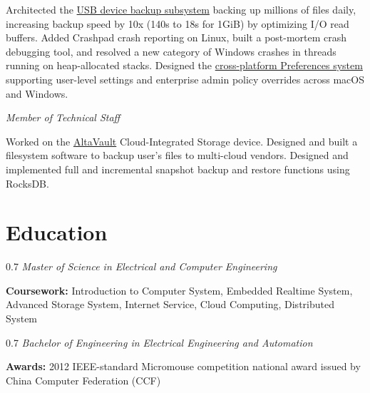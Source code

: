 \documentclass{yijiem}
\begin{document}
\begin{description}
{        {Architected the \href{https://blog.google/products-and-platforms/products/workspace/drive-for-desktop/}{USB device backup subsystem} backing up millions of files daily, increasing backup speed by 10x (140s to 18s for 1GiB) by optimizing I/O read buffers.}
        {Added Crashpad crash reporting on Linux, built a post-mortem crash debugging tool, and resolved a new category of Windows crashes in threads running on heap-allocated stacks.}
        {Designed the \href{https://knowledge.workspace.google.com/admin/drive/advanced-drive-for-desktop-configuration}{cross-platform Preferences system} supporting user-level settings and enterprise admin policy overrides across macOS and Windows.}}
    \end{description}
    \textit{\small Member of Technical Staff}\par\vspace{1pt}
    Worked on the \href{https://www.netapp.com/media/19930-ds-3651.pdf}{AltaVault} Cloud-Integrated Storage device. Designed and built a filesystem software to backup user's files to multi-cloud vendors. Designed and implemented full and incremental snapshot backup and restore functions using RocksDB.

\section{Education}
    \begin{spacing}{0.7}
    \textit{\small Master of Science in Electrical and Computer Engineering}\newline
    \end{spacing}
    \textbf{Coursework:} Introduction to Computer System, Embedded Realtime System, Advanced Storage System, Internet Service, Cloud Computing, Distributed System
    \begin{spacing}{0.7}
    \textit{\small Bachelor of Engineering in Electrical Engineering and Automation}\newline
    \end{spacing}
    \textbf{Awards:} 2012 IEEE-standard Micromouse competition national award issued by China Computer Federation (CCF)
\end{document}
